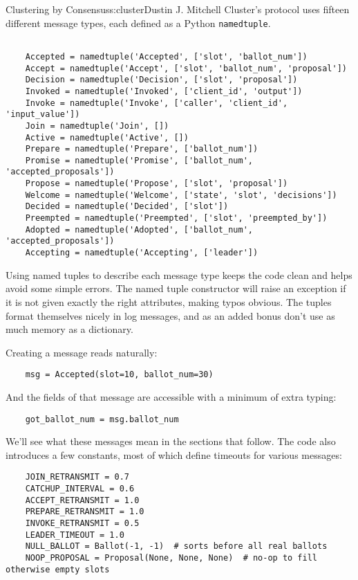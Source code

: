 \begin{aosachapter}{Clustering by Consensus}{s:cluster}{Dustin J. Mitchell}
Cluster's protocol uses fifteen different message types, each defined as
a Python \texttt{namedtuple}.

\begin{verbatim}

    Accepted = namedtuple('Accepted', ['slot', 'ballot_num'])
    Accept = namedtuple('Accept', ['slot', 'ballot_num', 'proposal'])
    Decision = namedtuple('Decision', ['slot', 'proposal'])
    Invoked = namedtuple('Invoked', ['client_id', 'output'])
    Invoke = namedtuple('Invoke', ['caller', 'client_id', 'input_value'])
    Join = namedtuple('Join', [])
    Active = namedtuple('Active', [])
    Prepare = namedtuple('Prepare', ['ballot_num'])
    Promise = namedtuple('Promise', ['ballot_num', 'accepted_proposals'])
    Propose = namedtuple('Propose', ['slot', 'proposal'])
    Welcome = namedtuple('Welcome', ['state', 'slot', 'decisions'])
    Decided = namedtuple('Decided', ['slot'])
    Preempted = namedtuple('Preempted', ['slot', 'preempted_by'])
    Adopted = namedtuple('Adopted', ['ballot_num', 'accepted_proposals'])
    Accepting = namedtuple('Accepting', ['leader'])
\end{verbatim}

Using named tuples to describe each message type keeps the code clean
and helps avoid some simple errors. The named tuple constructor will
raise an exception if it is not given exactly the right attributes,
making typos obvious. The tuples format themselves nicely in log
messages, and as an added bonus don't use as much memory as a
dictionary.

Creating a message reads naturally:

\begin{verbatim}
    msg = Accepted(slot=10, ballot_num=30)
\end{verbatim}

And the fields of that message are accessible with a minimum of extra
typing:

\begin{verbatim}
    got_ballot_num = msg.ballot_num
\end{verbatim}

We'll see what these messages mean in the sections that follow. The code
also introduces a few constants, most of which define timeouts for
various messages:

\begin{verbatim}
    JOIN_RETRANSMIT = 0.7
    CATCHUP_INTERVAL = 0.6
    ACCEPT_RETRANSMIT = 1.0
    PREPARE_RETRANSMIT = 1.0
    INVOKE_RETRANSMIT = 0.5
    LEADER_TIMEOUT = 1.0
    NULL_BALLOT = Ballot(-1, -1)  # sorts before all real ballots
    NOOP_PROPOSAL = Proposal(None, None, None)  # no-op to fill otherwise empty slots
    

\end{verbatim}
\end{aosachapter}
